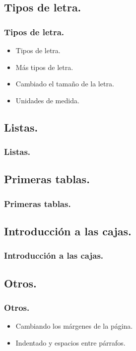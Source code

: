 \documentclass{beamer}
\begin{document}
\subsection{Tipos de letra.}
\begin{frame}
  \frametitle{Tipos de letra.}
  \begin{itemize}
  \item<1->{Tipos de letra.}
  \item<2->{Más tipos de letra.}
  \item<3->{Cambiado el tamaño de la letra.}
  \item<4->{Unidades de medida.}
  \end{itemize}
\end{frame}

\subsection{Listas.}
\begin{frame}
  \frametitle{Listas.}
\end{frame}

\subsection{Primeras tablas.}
\begin{frame}
  \frametitle{Primeras tablas.}
\end{frame}

\subsection{Introducción a las cajas.}
\begin{frame}
  \frametitle{Introducción a las cajas.}
\end{frame}

\subsection{Otros.}
\begin{frame}
  \frametitle{Otros.}
  \begin{itemize}
  \item<1->{Cambiando los márgenes de la página.}
  \item<2->{Indentado y espacios entre párrafos.}
  \end{itemize}
\end{frame}
\end{document}
